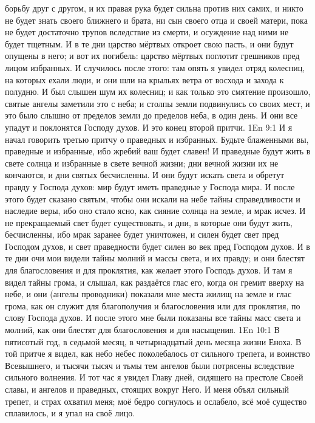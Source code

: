 борьбу друг с другом, и их правая рука будет сильна против них самих, и никто
не будет знать своего ближнего и брата, ни сын своего отца и своей матери, пока
не будет достаточно трупов вследствие из смерти, и осуждение над ними не будет
тщетным.
И в те дни царство мёртвых откроет свою пасть, и они будут опущены в
него; и вот их погибель: царство мёртвых поглотит грешников пред лицом
избранных.
И случилось после этого: там опять я увидел отряд колесниц, на
которых ехали люди, и они шли на крыльях ветра от восхода и захода к полудню.
И был слышен шум их колесниц; и как только это смятение произошло,
святые ангелы заметили это с неба; и столпы земли подвинулись со своих мест, и
это было слышно от пределов земли до пределов неба, в один день.
И они все упадут и поклонятся Господу духов.
И это конец второй притчи.
\vs 1En 9:1
И я начал говорить третью притчу о праведных и избранных.
Будьте блаженными вы, праведные и избранные, ибо жребий ваш будет
славен!
И праведные будут жить в свете солнца и избранные в свете вечной жизни;
дни вечной жизни их не кончаются, и дни святых бесчисленны.
И они будут искать света и обретут правду у Господа духов: мир будут
иметь праведные у Господа мира.
И после этого будет сказано святым, чтобы они искали на небе тайны
справедливости и наследие веры, ибо оно стало ясно, как сияние солнца на земле,
и мрак исчез.
И не прекращаемый свет будет существовать, и дни, в которые они будут
жить, бесчисленны, ибо мрак заранее будет уничтожен, и силен будет свет пред
Господом духов, и свет праведности будет силен во век пред Господом духов.
И в те дни очи мои видели тайны молний и массы света, и их правду;
и они блестят для благословения и для проклятия, как желает этого Господь
духов.
И там я видел тайны грома, и слышал, как раздаётся глас его, когда он
гремит вверху на небе, и они (ангелы проводники) показали мне места жилищ на
земле и глас грома, как он служит для благополучия и благословения или для
проклятия, по слову Господа духов.
И после этого мне были показаны все тайны масс света и молний, как они
блестят для благословения и для насыщения.
\vs 1En 10:1
В пятисотый год, в седьмой месяц, в четырнадцатый день месяца
жизни Еноха.
В той притче я видел, как небо небес поколебалось от сильного трепета,
и воинство Всевышнего, и тысячи тысяч и тьмы тем ангелов были потрясены
вследствие сильного волнения.
И тот час я увидел Главу дней, сидящего на престоле Своей славы, и
ангелов и праведных, стоящих вокруг Него.
И меня объял сильный трепет, и страх охватил меня; моё бедро согнулось
и ослабело, всё моё существо сплавилось, и я упал на своё лицо.
